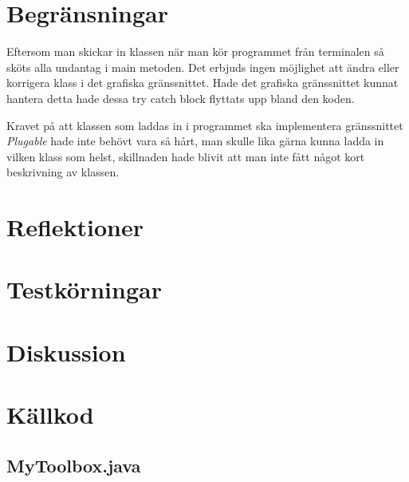 \documentclass[a4paper, 12pt]{article}
\begin{document}
\section{Begränsningar}

Eftersom man skickar in klassen när man kör programmet från terminalen
så sköts alla undantag i main metoden. Det erbjuds ingen möjlighet att
ändra eller korrigera klass i det grafiska gränssnittet. Hade det
grafiska gränssnittet kunnat hantera detta hade dessa try catch block
flyttats upp bland den koden.

Kravet på att klassen som laddas in i programmet ska implementera
gränssnittet \textit{Plugable} hade inte behövt vara så hårt, man
skulle lika gärna kunna ladda in vilken klass som helst, skillnaden
hade blivit att man inte fått något kort beskrivning av klassen.


\section{Reflektioner}

\section{Testkörningar}

\section{Diskussion}

\newpage
\appendix
{}
\section{Källkod}
\subsection{MyToolbox.java}
\begin{footnotesize}

\end{footnotesize}
\end{document}
